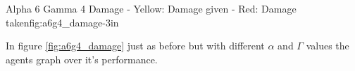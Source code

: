 			{Alpha 6 Gamma 4 Damage - Yellow: Damage given - Red: Damage taken}{fig:a6g4_damage}{-3in}

In figure \ref{fig:a6g4_damage} just as before but with different $\alpha$ and $\Gamma$ values the agents graph over it's performance.



\\